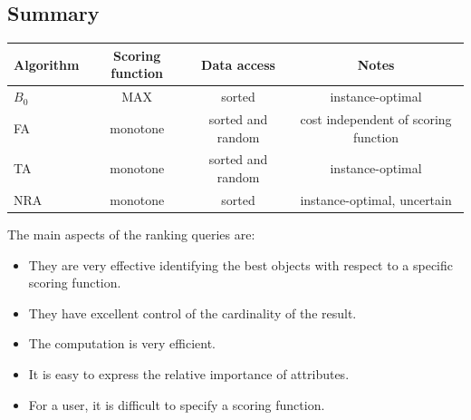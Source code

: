 \subsection*{Summary}
\begin{table}[H]
    \centering
    \begin{tabular}{l|ccc}
    \multicolumn{1}{c|}{\textbf{Algorithm}} & \textbf{Scoring function} & \textbf{Data access} & \textbf{Notes}                       \\ \hline
    $B_0$                                   & MAX                       & sorted               & instance-optimal                     \\
    FA                                      & monotone                  & sorted and random    & cost independent of scoring function \\
    TA                                      & monotone                  & sorted and random    & instance-optimal                     \\
    NRA                                     & monotone                  & sorted               & instance-optimal, uncertain         
    \end{tabular}
\end{table}

The main aspects of the ranking queries are: 
\begin{itemize}
    \item They are very effective identifying the best objects with respect to a specific scoring function. 
    \item They have excellent control of the cardinality of the result. 
    \item The computation is very efficient. 
    \item It is easy to express the relative importance of attributes. 
    \item For a user, it is difficult to specify a scoring function. 
\end{itemize}
